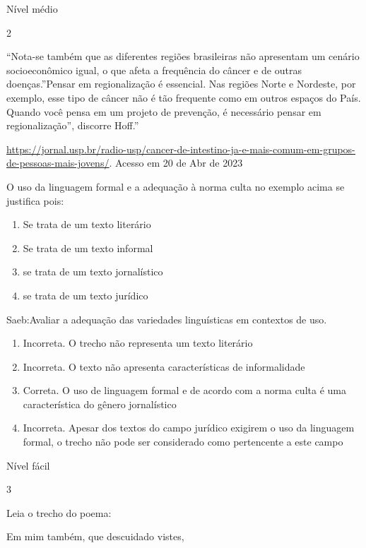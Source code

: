 {{\begin{itemize}
\begin{itemize}
Nível médio

\num{2}

``Nota-se também que as diferentes regiões brasileiras não apresentam um
cenário socioeconômico igual, o que afeta a frequência do câncer e de
outras doenças.''Pensar em regionalização é essencial. Nas regiões Norte
e Nordeste, por exemplo, esse tipo de câncer não é tão frequente como em
outros espaços do País. Quando você pensa em um projeto de prevenção, é
necessário pensar em regionalização'', discorre Hoff.''

\href{https://jornal.usp.br/radio-usp/cancer-de-intestino-ja-e-mais-comum-em-grupos-de-pessoas-mais-jovens/}{\uline{https://jornal.usp.br/radio-usp/cancer-de-intestino-ja-e-mais-comum-em-grupos-de-pessoas-mais-jovens/}}.
Acesso em 20 de Abr de 2023

O uso da linguagem formal e a adequação à norma culta no exemplo acima
se justifica pois:

\begin{enumerate}
\def\labelenumi{\alph{enumi})}
\item
  Se trata de um texto literário
\item
  Se trata de um texto informal
\item
  se trata de um texto jornalístico
\item
  se trata de um texto jurídico
\end{enumerate}

Saeb:Avaliar a adequação das variedades linguísticas em contextos de
uso.

\begin{enumerate}
\def\labelenumi{\arabic{enumi}.}
\item
  Incorreta. O trecho não representa um texto literário
\item
  Incorreta. O texto não apresenta características de informalidade
\item
  Correta. O uso de linguagem formal e de acordo com a norma culta é uma
  característica do gênero jornalístico
\item
  Incorreta. Apesar dos textos do campo jurídico exigirem o uso da
  linguagem formal, o trecho não pode ser considerado como pertencente a
  este campo
\end{enumerate}

Nível fácil

\num{3}

Leia o trecho do poema:

Em mim também, que descuidado vistes,


\end{itemize}
\end{itemize}}}
